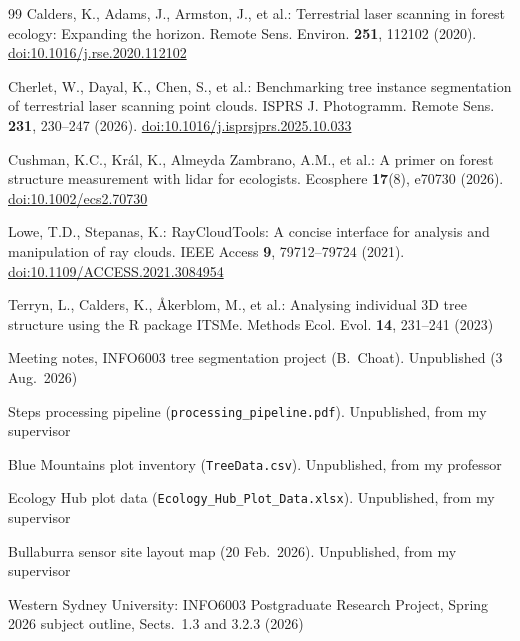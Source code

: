 \documentclass[runningheads]{llncs}
\begin{document}
\begin{thebibliography}{99}\setlength{\itemsep}{0pt}
Calders, K., Adams, J., Armston, J., et al.: Terrestrial laser scanning in forest ecology: Expanding the horizon. Remote Sens. Environ. \textbf{251}, 112102 (2020). \href{https://doi.org/10.1016/j.rse.2020.112102}{doi:10.1016/j.rse.2020.112102}

Cherlet, W., Dayal, K., Chen, S., et al.: Benchmarking tree instance segmentation of terrestrial laser scanning point clouds. ISPRS J. Photogramm. Remote Sens. \textbf{231}, 230--247 (2026). \href{https://doi.org/10.1016/j.isprsjprs.2025.10.033}{doi:10.1016/j.isprsjprs.2025.10.033}

Cushman, K.C., Kr\'al, K., Almeyda Zambrano, A.M., et al.: A primer on forest structure measurement with lidar for ecologists. Ecosphere \textbf{17}(8), e70730 (2026). \href{https://doi.org/10.1002/ecs2.70730}{doi:10.1002/ecs2.70730}

Lowe, T.D., Stepanas, K.: RayCloudTools: A concise interface for analysis and manipulation of ray clouds. IEEE Access \textbf{9}, 79712--79724 (2021). \href{https://doi.org/10.1109/ACCESS.2021.3084954}{doi:10.1109/ACCESS.2021.3084954}

Terryn, L., Calders, K., \AA{}kerblom, M., et al.: Analysing individual 3D tree structure using the R package ITSMe. Methods Ecol. Evol. \textbf{14}, 231--241 (2023)

Meeting notes, INFO6003 tree segmentation project (B.~Choat). Unpublished (3 Aug.\ 2026)

Steps processing pipeline (\nolinkurl{processing_pipeline.pdf}). Unpublished, from my supervisor

Blue Mountains plot inventory (\nolinkurl{TreeData.csv}). Unpublished, from my professor

Ecology Hub plot data (\nolinkurl{Ecology_Hub_Plot_Data.xlsx}). Unpublished, from my supervisor

Bullaburra sensor site layout map (20 Feb.\ 2026). Unpublished, from my supervisor

Western Sydney University: INFO6003 Postgraduate Research Project, Spring 2026 subject outline, Sects.~1.3 and 3.2.3 (2026)
\end{thebibliography}
\end{document}
